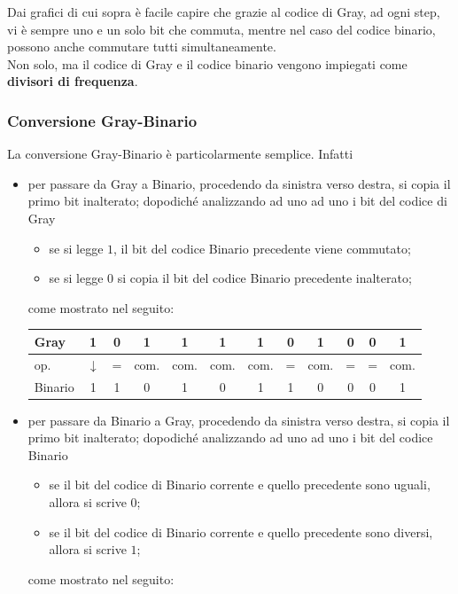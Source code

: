 \documentclass[a4paper]{extarticle}
\renewcommand\arraystretch{}
\begin{document}
\vspace{1em}
\noindent
Dai grafici di cui sopra è facile capire che grazie al codice di Gray, ad ogni step, vi è sempre uno e un solo bit che commuta, mentre nel caso del codice binario, possono anche commutare tutti simultaneamente.\\
Non solo, ma il codice di Gray e il codice binario vengono impiegati come \textbf{divisori di frequenza}.

\vspace{1em}
\subsubsection{Conversione Gray-Binario}
La conversione Gray-Binario è particolarmente semplice. Infatti
\begin{itemize}
    \item per passare da Gray a Binario, procedendo da sinistra verso destra, si copia il primo bit inalterato; dopodiché analizzando ad uno ad uno i bit del codice di Gray
    \begin{itemize}
        \item se si legge $1$, il bit del codice Binario precedente viene commutato;
        \item se si legge $0$ si copia il bit del codice Binario precedente inalterato;
    \end{itemize}
    come mostrato nel seguito:

    \noindent
    \begin{table}[H]
    \setlength{\tabcolsep}{4pt}
    \renewcommand{\arraystretch}{1.2}
    \centering
    \begin{tabular}{|l|c|c|c|c|c|c|c|c|c|c|c|}
        \hline
        Gray & 1 & 0 & 1 & 1 & 1 & 1 & 0 & 1 & 0 & 0 & 1\\
        \hline
        op. & $\downarrow$ & = & com. & com. & com. & com. & = & com. & = & = & com.\\
        \hline
        Binario & 1 & 1 & 0 & 1 & 0 & 1 & 1 & 0 & 0 & 0 & 1\\
        \hline
    \end{tabular}
    \end{table}

    \item per passare da Binario a Gray, procedendo da sinistra verso destra, si copia il primo bit inalterato; dopodiché analizzando ad uno ad uno i bit del codice Binario
    \begin{itemize}
        \item se il bit del codice di Binario corrente e quello precedente sono uguali, allora si scrive $0$;
        \item se il bit del codice di Binario corrente e quello precedente sono diversi, allora si scrive $1$;
    \end{itemize}
    come mostrato nel seguito:


\end{itemize}
\end{document}
